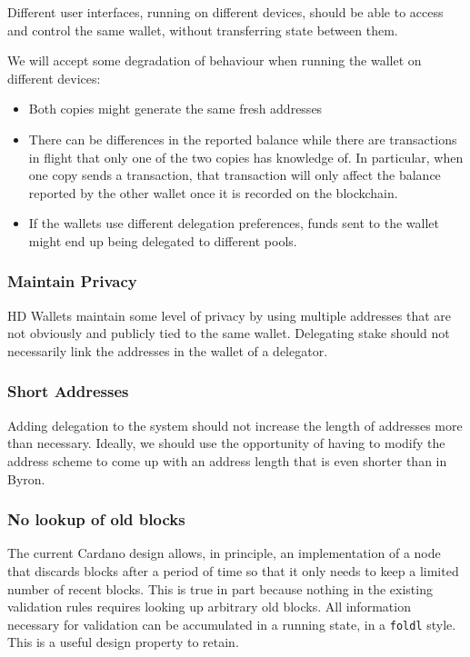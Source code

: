 \documentclass[11pt,a4paper]{article}
\begin{document}
Different user interfaces, running on different devices, should be able
to access and control the same wallet, without transferring state
between them.

We will accept some degradation of behaviour when running the wallet on
different devices:

\begin{itemize}
\item
  Both copies might generate the same fresh addresses
\item
  There can be differences in the reported balance while there are
  transactions in flight that only one of the two copies has knowledge
  of. In particular, when one copy sends a transaction, that transaction
  will only affect the balance reported by the other wallet once it is
  recorded on the blockchain.
\item
  If the wallets use different delegation preferences, funds sent to the
  wallet might end up being delegated to different pools.
\end{itemize}

\subsubsection{Maintain Privacy}
\label{maintain-privacy}

HD Wallets maintain some level of privacy by using multiple addresses
that are not obviously and publicly tied to the same wallet. Delegating
stake should not necessarily link the addresses in the wallet of a
delegator.

\subsubsection{Short Addresses}
\label{short-addresses}

Adding delegation to the system should not increase the length of
addresses more than necessary. Ideally, we should use the opportunity of having
to modify the address scheme to come up with an address length that is
even shorter than in Byron.

\subsubsection{No lookup of old blocks}
\label{no-lookup-of-old-blocks}

The current Cardano design allows, in principle, an implementation of a
node that discards blocks after a period of time so that it only needs
to keep a limited number of recent blocks. This is true in part because
nothing in the existing validation rules requires looking up arbitrary
old blocks. All information necessary for validation can be accumulated
in a running state, in a \texttt{foldl} style. This is a useful design
property to retain.
\end{document}
